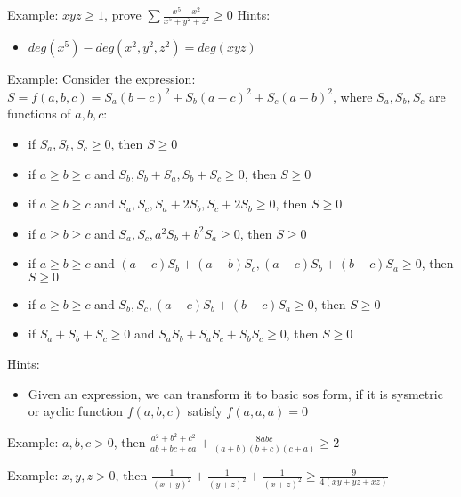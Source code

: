 \clearpage
Example: $xyz\geq 1$, prove $\sum \frac{x^5-x^2}{x^5+y^2+z^2}\geq 0$ 
\clearpage
Hints:
\begin{itemize}
\item $deg(x^5)-deg(x^2,y^2,z^2)=deg(xyz)$ 
\end{itemize}


\clearpage
Example: Consider the expression:
$S=f(a,b,c)=S_a(b-c)^2+S_b(a-c)^2+S_c(a-b)^2$, where $S_a, S_b, S_c$ are functions
of $a,b,c$:
\begin{itemize}
\item if $S_a,S_b,S_c\geq 0$, then $S\geq 0$
\item if $a\geq b\geq c$ and $S_b, S_b+S_a, S_b+S_c\geq 0$, then $S\geq 0$
\item if $a\geq b\geq c$ and $S_a, S_c, S_a+2S_b, S_c+2S_b\geq 0$, then $S\geq 0$
\item if $a\geq b\geq c$ and $S_a, S_c, a^2S_b+b^2S_a\geq 0$, then $S\geq 0$
\item if $a\geq b\geq c$ and $(a-c)S_b+(a-b)S_c, (a-c)S_b+(b-c)S_a\geq 0$, then $S\geq 0$
\item if $a\geq b\geq c$ and $S_b, S_c, (a-c)S_b+(b-c)S_a\geq 0$, then $S\geq 0$ 
\item if $S_a+S_b+S_c\geq 0$ and $S_aS_b+S_aS_c+S_bS_c\geq 0$, then $S\geq 0$
\end{itemize}
\clearpage
Hints:
\begin{itemize}
\item Given an expression, we can transform it to basic sos form, if it is sysmetric 
or ayclic function $f(a,b,c)$ satisfy $f(a,a,a)=0$ 
\end{itemize}


\clearpage
Example: $a,b,c>0$, then $\frac{a^2+b^2+c^2}{ab+bc+ca}+\frac{8abc}{(a+b)(b+c)(c+a)}\geq 2$
 

\clearpage
Example: $x,y,z>0$, then $\frac{1}{(x+y)^2}+\frac{1}{(y+z)^2}+\frac{1}{(x+z)^2}\geq
\frac{9}{4(xy+yz+xz)}$ 





















